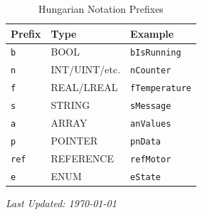 \documentclass[11pt,a4paper]{article}
\begin{document}
\begin{table}[h]
\centering
\begin{tabular}{@{}lll@{}}
\toprule
\textbf{Prefix} & \textbf{Type} & \textbf{Example} \\
\midrule
\texttt{b} & BOOL & \texttt{bIsRunning} \\
\texttt{n} & INT/UINT/etc. & \texttt{nCounter} \\
\texttt{f} & REAL/LREAL & \texttt{fTemperature} \\
\texttt{s} & STRING & \texttt{sMessage} \\
\texttt{a} & ARRAY & \texttt{anValues} \\
\texttt{p} & POINTER & \texttt{pnData} \\
\texttt{ref} & REFERENCE & \texttt{refMotor} \\
\texttt{e} & ENUM & \texttt{eState} \\
\bottomrule
\end{tabular}
\caption{Hungarian Notation Prefixes}
\end{table}

\vfill

\begin{center}
\textit{Last Updated: \today}
\end{center}
\end{document}
